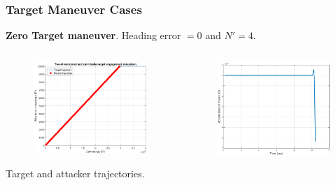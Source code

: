 \documentclass{beamer}
\begin{document}
\begin{frame}
\frametitle{Target Maneuver Cases}

\textbf{Zero Target maneuver}. Heading error $=0$ and $N'= 4$.
\begin{columns}[c]
	\begin{column}{.3\linewidth}
		\begin{figure}[H]
			\centering
			\includegraphics[scale = 0.165]{fig/trajectoryXNT0HE0N4.pdf}
			\label{trajectoryXNT0HE0N4}
		\end{figure}
	Target and attacker trajectories.
	\end{column}
	\begin{column}{.3\linewidth}
		\begin{figure}[H]
			\centering
			\includegraphics[scale = 0.175]{fig/MissileAccelerationXNT0HE0N4.pdf}

\end{figure}
\end{column}
\end{columns}
\end{frame}
\end{document}

